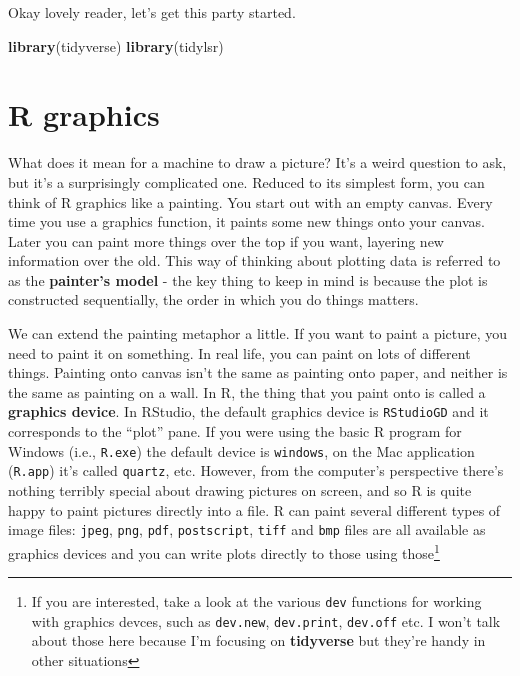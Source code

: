 \documentclass[]{book}
\newenvironment{Shaded}{\begin{snugshade}}{\end{snugshade}}
\newcommand{\KeywordTok}[1]{\textcolor[rgb]{0.13,0.29,0.53}{\textbf{#1}}}
\newcommand{\NormalTok}[1]{#1}
\let\rmarkdownfootnote\footnote%
\def\footnote{\protect\rmarkdownfootnote}
\begin{document}
Okay lovely reader, let's get this party started.

\begin{Shaded}
\begin{Highlighting}[]
\KeywordTok{library}\NormalTok{(tidyverse)}
\KeywordTok{library}\NormalTok{(tidylsr)}
\end{Highlighting}
\end{Shaded}

\hypertarget{r-graphics}{%
\section{R graphics}\label{r-graphics}}

What does it mean for a machine to draw a picture? It's a weird question to ask, but it's a surprisingly complicated one. Reduced to its simplest form, you can think of R graphics like a painting. You start out with an empty canvas. Every time you use a graphics function, it paints some new things onto your canvas. Later you can paint more things over the top if you want, layering new information over the old. This way of thinking about plotting data is referred to as the \textbf{painter's model} - the key thing to keep in mind is because the plot is constructed sequentially, the order in which you do things matters.

We can extend the painting metaphor a little. If you want to paint a picture, you need to paint it on something. In real life, you can paint on lots of different things. Painting onto canvas isn't the same as painting onto paper, and neither is the same as painting on a wall. In R, the thing that you paint onto is called a \textbf{graphics device}. In RStudio, the default graphics device is \texttt{RStudioGD} and it corresponds to the ``plot'' pane. If you were using the basic R program for Windows (i.e., \texttt{R.exe}) the default device is \texttt{windows}, on the Mac application (\texttt{R.app}) it's called \texttt{quartz}, etc. However, from the computer's perspective there's nothing terribly special about drawing pictures on screen, and so R is quite happy to paint pictures directly into a file. R can paint several different types of image files: \texttt{jpeg}, \texttt{png}, \texttt{pdf}, \texttt{postscript}, \texttt{tiff} and \texttt{bmp} files are all available as graphics devices and you can write plots directly to those using those\footnote{If you are interested, take a look at the various \texttt{dev} functions for working with graphics devces, such as \texttt{dev.new}, \texttt{dev.print}, \texttt{dev.off} etc. I won't talk about those here because I'm focusing on \textbf{tidyverse} but they're handy in other situations}
\end{document}
